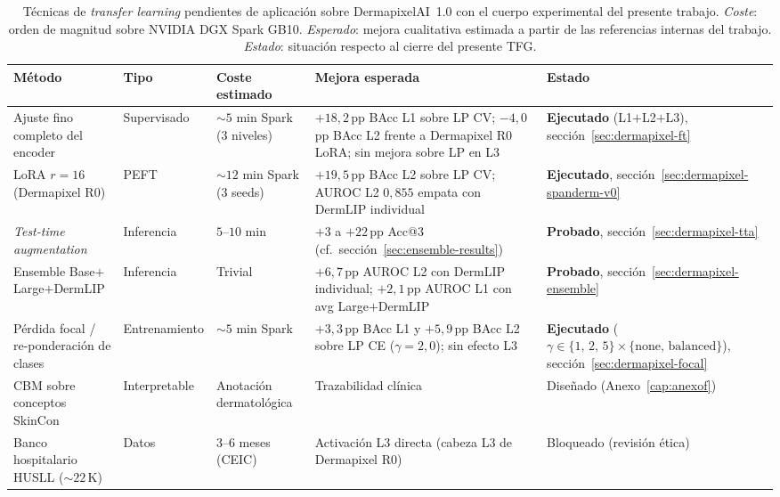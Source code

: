 \begin{table}[H]
\centering
\footnotesize
\setlength{\tabcolsep}{4pt}
\renewcommand{\arraystretch}{0.95}
\caption{Técnicas de \emph{transfer learning} pendientes de
aplicación sobre DermapixelAI~1.0 con el cuerpo experimental del
presente trabajo. \emph{Coste}: orden de magnitud sobre NVIDIA DGX
Spark GB10. \emph{Esperado}: mejora cualitativa estimada a partir
de las referencias internas del trabajo. \emph{Estado}: situación
respecto al cierre del presente TFG.}
\label{tab:dermapixel-pendiente}
\begin{tabular}{p{}p{}p{}p{}p{}}
\hline
Método & Tipo & Coste estimado & Mejora esperada & Estado \\
\hline
Ajuste fino completo del encoder        & Supervisado            & $\sim 5$ min Spark (3 niveles) & $+18{,}2$\,pp BAcc L1 sobre LP CV; $-4{,}0$\,pp BAcc L2 frente a Dermapixel R0 LoRA; sin mejora sobre LP en L3 & \textbf{Ejecutado} (L1$+$L2$+$L3), sección~\ref{sec:dermapixel-ft} \\
LoRA $r=16$ (Dermapixel R0)             & PEFT                   & $\sim 12$ min Spark (3 seeds) & $+19{,}5$\,pp BAcc L2 sobre LP CV; AUROC L2 $0{,}855$ empata con DermLIP individual & \textbf{Ejecutado}, sección~\ref{sec:dermapixel-spanderm-v0} \\
\emph{Test-time augmentation}           & Inferencia             & $5$--$10$ min              & $+3$ a $+22$\,pp Acc@3 (cf.\ sección~\ref{sec:ensemble-results}) & \textbf{Probado}, sección~\ref{sec:dermapixel-tta} \\
Ensemble Base$+$Large$+$DermLIP         & Inferencia             & Trivial                    & $+6{,}7$\,pp AUROC L2 con DermLIP individual; $+2{,}1$\,pp AUROC L1 con avg Large$+$DermLIP & \textbf{Probado}, sección~\ref{sec:dermapixel-ensemble} \\
Pérdida focal / re-ponderación de clases & Entrenamiento         & $\sim 5$ min Spark         & $+3{,}3$\,pp BAcc L1 y $+5{,}9$\,pp BAcc L2 sobre LP CE ($\gamma = 2{,}0$); sin efecto L3 & \textbf{Ejecutado} ($\gamma \in \{1,\,2,\,5\} \times \{\text{none},\,\text{balanced}\}$), sección~\ref{sec:dermapixel-focal} \\
CBM sobre conceptos SkinCon              & Interpretable          & Anotación dermatológica    & Trazabilidad clínica                                          & Diseñado (Anexo~\ref{cap:anexof}) \\
Banco hospitalario HUSLL ($\sim 22$\,K) & Datos                  & $3$--$6$ meses (CEIC)      & Activación L3 directa (cabeza L3 de Dermapixel R0)            & Bloqueado (revisión ética) \\
\hline
\end{tabular}
\end{table}

